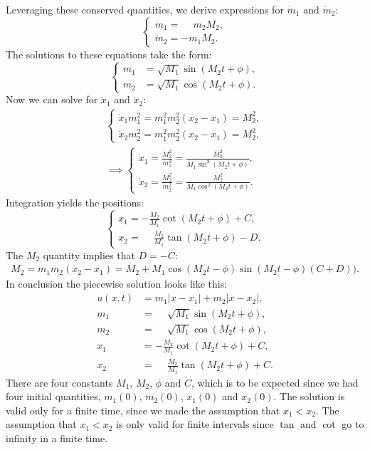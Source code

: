 \documentclass[english,master]{liumaiex}
\theoremstyle{plain}
\theoremstyle{definition}
\begin{document}
%
Leveraging these conserved quantities, we derive expressions for $\dot{m}_1$ and $\dot{m}_2$:
\begin{equation}
\left\{ \begin{aligned}
	\dot{m}_1 = \phantom{-}m_2M_2, \\
	\dot{m}_2 = -m_1M_2.
\end{aligned} \right.
\end{equation}
%
The solutions to these equations take the form:
\begin{equation}
\left\{ \begin{aligned}
	m_1 &= \sqrt{M_1} \sin(M_2t + \phi), \\
	m_2 &= \sqrt{M_1} \cos(M_2t + \phi).
\end{aligned} \right.
\end{equation}
%
Now we can solve for $\dot{x}_1$ and $\dot{x}_2$:
\begin{align}
\left\{ \begin{aligned}
	\dot{x}_1m_1^2 = m_1^2m_2^2(x_2 - x_1) = M_2^2, \\
	\dot{x}_2m_2^2 = m_1^2m_2^2(x_2 - x_1) = M_2^2,
\end{aligned} \right. \\
\implies \left\{ \begin{aligned}
	\dot{x}_1 = \frac{M_2^2}{m_1^2} = \frac{M_2^2}{M_1\sin^2(M_2t + \phi)}, \\
	\dot{x}_2 = \frac{M_2^2}{m_2^2} = \frac{M_2^2}{M_1\cos^2(M_2t + \phi)}.
\end{aligned} \right.
\end{align}
%
Integration yields the positions:
\begin{equation}
\left\{ \begin{aligned}
	x_1 = -\frac{M_2}{M_1}\cot(M_2t + \phi) + C,\\
	x_2 = \phantom{-}\frac{M_2}{M_1}\tan(M_2t + \phi) - D.
\end{aligned} \right.
\end{equation}
%
The $M_2$ quantity implies that $D = -C$:
\begin{align}
	M_2 = m_1m_2(x_2 - x_1) = M_2 + M_1\cos(M_2t-\phi)\sin(M_2t-\phi)(C + D)).
\end{align}
%
In conclusion the piecewise solution looks like this:
\begin{align}
	u(x, t) &= m_1|x - x_1| + m_2|x - x_2|, \\
	m_1 &= \phantom{-}\sqrt{M_1} \sin(M_2t + \phi), \\
	m_2 &= \phantom{-}\sqrt{M_1} \cos(M_2t + \phi), \\
	x_1 &= -\frac{M_2}{M_1}\cot(M_2t + \phi) + C, \\
	x_2 &= \phantom{-}\frac{M_2}{M_1}\tan(M_2t + \phi) + C.
\end{align}
%
There are four constants $M_1$, $M_2$, $\phi$ and $C$, which is to be expected since we had four initial quantities, $m_1(0)$, $m_2(0)$, $x_1(0)$ and $x_2(0)$. The solution is valid only for a finite time, since we made the assumption that $x_1 < x_2$. The assumption that $x_1 < x_2$ is only valid for finite intervals since $\tan$ and $\cot$ go to infinity in a finite time.
\end{document}
